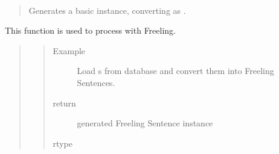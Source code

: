 \documentclass[letterpaper,10pt,english]{sphinxmanual}
\begin{document}
\begin{fulllineitems}
\begin{quote}
\begin{description}
\begin{itemize}
\end{itemize}

\end{description}\end{quote}

\begin{fulllineitems}
\label{\detokenize{classes:loacore.classes.classes.Sentence.compute_freeling_sentence}}~\begin{quote}

Generates a basic  instance, converting  as  .
\end{quote}

This function is used to process {\hyperref[\detokenize{classes:loacore.classes.classes.Sentence}]{}} with Freeling.
\begin{quote}
\begin{quote}\begin{description}
\item[{Example}] \leavevmode
Load {\hyperref[\detokenize{classes:loacore.classes.classes.Sentence}]{}} s from database and convert them into Freeling Sentences.

%
\begin{sphinxVerbatim}[commandchars=\\\{\}]
   
  
  \PYG{p}{[}    \PYG{p}{]}
\end{sphinxVerbatim}

\item[{return}] \leavevmode
generated Freeling Sentence instance

\item[{rtype}] \leavevmode
{}


\end{description}
\end{quote}
\end{quote}
\end{fulllineitems}
\end{fulllineitems}
\end{document}
